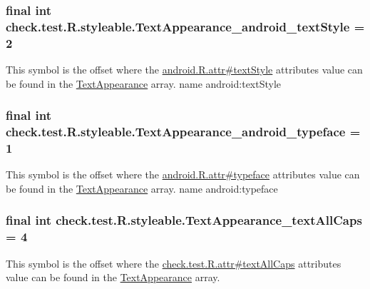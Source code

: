 \subsubsection[{Text\+Appearance\+\_\+android\+\_\+text\+Style}]{\setlength{\rightskip}{0pt plus 5cm}final int check.\+test.\+R.\+styleable.\+Text\+Appearance\+\_\+android\+\_\+text\+Style = 2\hspace{0.3cm}{\ttfamily [static]}}\label{classcheck_1_1test_1_1_r_1_1styleable_a322f409bd5e2d20b43b0f42b53151ebf}
This symbol is the offset where the \hyperlink{}{android.\+R.\+attr\#text\+Style} attribute\textquotesingle{}s value can be found in the \hyperlink{classcheck_1_1test_1_1_r_1_1styleable_a7fad54db5b363c4751d9f6f6ead61bc9}{Text\+Appearance} array.  name android\+:text\+Style \hypertarget{classcheck_1_1test_1_1_r_1_1styleable_a084a3e7bc2b4a8412125c1fcc233b116}{}
\subsubsection[{Text\+Appearance\+\_\+android\+\_\+typeface}]{\setlength{\rightskip}{0pt plus 5cm}final int check.\+test.\+R.\+styleable.\+Text\+Appearance\+\_\+android\+\_\+typeface = 1\hspace{0.3cm}{\ttfamily [static]}}\label{classcheck_1_1test_1_1_r_1_1styleable_a084a3e7bc2b4a8412125c1fcc233b116}
This symbol is the offset where the \hyperlink{}{android.\+R.\+attr\#typeface} attribute\textquotesingle{}s value can be found in the \hyperlink{classcheck_1_1test_1_1_r_1_1styleable_a7fad54db5b363c4751d9f6f6ead61bc9}{Text\+Appearance} array.  name android\+:typeface \hypertarget{classcheck_1_1test_1_1_r_1_1styleable_a5d5337464a97b9d29c16fc4176a319e7}{}
\subsubsection[{Text\+Appearance\+\_\+text\+All\+Caps}]{\setlength{\rightskip}{0pt plus 5cm}final int check.\+test.\+R.\+styleable.\+Text\+Appearance\+\_\+text\+All\+Caps = 4\hspace{0.3cm}{\ttfamily [static]}}\label{classcheck_1_1test_1_1_r_1_1styleable_a5d5337464a97b9d29c16fc4176a319e7}
This symbol is the offset where the \hyperlink{classcheck_1_1test_1_1_r_1_1attr_a09d1fb38439d083ce88110c7038a7949}{check.\+test.\+R.\+attr\#text\+All\+Caps} attribute\textquotesingle{}s value can be found in the \hyperlink{classcheck_1_1test_1_1_r_1_1styleable_a7fad54db5b363c4751d9f6f6ead61bc9}{Text\+Appearance} array.

